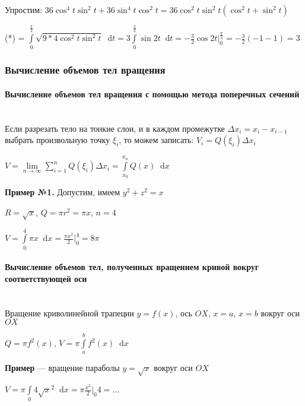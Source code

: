 \documentclass{article}
\newcommand*\diff{\mathop{}\!\mathrm{d}}
\begin{document}
Упростим: $36 \cos^4 t \sin^2 t + 36 \sin^4 t \cos^2 t = 36 \cos^2 t \sin^2 t (\cos^2 t + \sin^2 t)$

(*) = $\int\limits_{0}^{\frac{\pi}{2}} \sqrt{9 * 4 \cos^2 t \sin^2 t} \diff t = 3 \int\limits_{0}^{\frac{\pi}{2}} \sin 2t \diff t = -\frac{3}{2} \cos 2 t \bigg|_{0}^{\frac{\pi}{2}} = -\frac{3}{2} (-1 - 1) = 3$

\subsubsection{Вычисление объемов тел вращения}

\paragraph{Вычисление объемов тел вращения с помощью метода поперечных сечений}

\hfill \\[2mm]

Если разрезать тело на тонкие слои, и в каждом промежутке $\Delta x_i = x_i - x_{i - 1}$ выбрать произвольную точку $\xi_i$, то можем записать: $V_i = Q(\xi_i) \Delta x_i$

$V = \lim\limits_{n \to \infty} \sum\limits_{i = 1}^{n} Q(\xi_i) \Delta x_i = \int\limits_{x_0}^{x_{n}} Q(x) \diff x$

\hfill

\textbf{Пример №1.} Допустим, имеем $y^2 + z^2 = x$

$R = \sqrt{x}$, $Q = \pi r^2 = \pi x$, $n = 4$

$V = \int\limits_{0}^{4} \pi x \diff x = \frac{\pi x^2}{2} \bigg|_{0}^{4} = 8 \pi$

\paragraph{Вычисление объемов тел, полученных вращением кривой вокруг соответствующей оси}

\hfill \\[2mm]

Вращение криволинейной трапеции $y = f(x)$, ось $OX$, $x = a$, $x = b$ вокруг оси $OX$

$Q = \pi f^2(x)$, $V = \pi \int\limits_{a}^{b} f^2(x) \diff x$

\hfill

\textbf{Пример} — вращение параболы $y = \sqrt{x}$ вокруг оси $OX$

$V = \pi \int\limits_{0}{4} \sqrt{x}^2 \diff x = \pi \frac{x^2}{2} \bigg|_{0}{4} = \dots$ 
\end{document}
